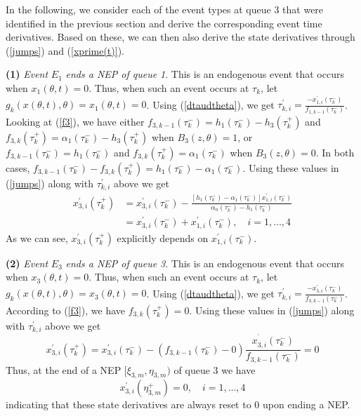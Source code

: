 \documentclass{ifacconf}\usepackage{graphicx}
\begin{document}
In the following, we consider each of the event types at queue $3$ that were
identified in the previous section and derive the corresponding event time
derivatives. Based on these, we can then also derive the state derivatives
through (\ref{jumps}) and (\ref{xprime(t)}).

\textbf{(1)} \emph{Event }$E_{1}$\emph{ ends a NEP of queue 1}. This is an
endogenous event that occurs when $x_{1}(\theta,t)=0$. Thus, when such an
event occurs at $\tau_{k}$, let $g_{k}(x(\theta,t),\theta)=x_{1}(\theta,t)=0$.
Using (\ref{dtaudtheta}), we get $\tau_{k,i}^{\prime}=\frac{-x_{1,i}^{\prime
}(\tau_{k}^{-})}{f_{1,k-1}(\tau_{k}^{-})}$. Looking at (\ref{f3}), we have
either $f_{3,k-1}(\tau_{k}^{-})=h_{1}(\tau_{k}^{-})-h_{3}(\tau_{k}^{+})$ and
$f_{3,k}(\tau_{k}^{+})=\alpha_{1}(\tau_{k}^{-})-h_{3}(\tau_{k}^{+})$ when
$B_{3}(z,\theta)=1$, or $f_{3,k-1}(\tau_{k}^{-})=h_{1}(\tau_{k}^{-})$ and
$f_{3,k}(\tau_{k}^{+})=\alpha_{1}(\tau_{k}^{-})$ when $B_{3}(z,\theta)=0$. In
both cases, $f_{3,k-1}(\tau_{k}^{-})-f_{3,k}(\tau_{k}^{+})=h_{1}(\tau_{k}^{-})-\alpha_{1}(\tau_{k}^{-})$. Using these values in (\ref{jumps}) along
with $\tau_{k,i}^{\prime}$ above we get\begin{align}
x_{3,i}^{\prime}(\tau_{k}^{+}) &  =x_{3,i}^{\prime}(\tau_{k}^{-})-\frac
{[h_{1}(\tau_{k}^{-})-\alpha_{1}(\tau_{k}^{-})]x_{1,i}^{\prime}(\tau_{k}^{-})}{\alpha_{n}(\tau_{k}^{-})-h_{1}(\tau_{k}^{-})}\nonumber\\
&  =x_{3,i}^{\prime}(\tau_{k}^{-})+x_{1,i}^{\prime}(\tau_{k}^{-}),\quad
i=1,\ldots,4\label{type1}\end{align}
As we can see, $x_{3,i}^{\prime}(\tau_{k}^{+})$ explicitly depends on
$x_{1,i}^{\prime}(\tau_{k}^{-})$.

\textbf{(2)} \emph{Event }$E_{3}$\emph{ ends a NEP of queue 3}. This is an
endogenous event that occurs when $x_{3}(\theta,t)=0$. Thus, when such an
event occurs at $\tau_{k}$, let $g_{k}(x(\theta,t),\theta)=x_{3}(\theta,t)=0$.
Using (\ref{dtaudtheta}), we get $\tau_{k,i}^{\prime}=\frac{-x_{3,i}^{\prime
}(\tau_{k}^{-})}{f_{3,k-1}(\tau_{k}^{-})}$. According to (\ref{f3}), we have
$f_{3,k}(\tau_{k}^{+})=0$. Using these values in (\ref{jumps}) along with
$\tau_{k,i}^{\prime}$ above we get\[
x_{3,i}^{\prime}(\tau_{k}^{+})=x_{3,i}^{\prime}(\tau_{k}^{-})-(f_{3,k-1}(\tau_{k}^{-})-0)\frac{x_{3,i}^{^{\prime}}(\tau_{k}^{-})}{f_{3,k-1}(\tau
_{k}^{-})}=0
\]
Thus, at the end of a NEP $[\xi_{3,m},\eta_{3,m})$ of queue $3$ we have\begin{equation}
x_{3,i}^{\prime}(\eta_{3,m}^{+})=0,\quad i=1,\ldots,4\label{E_event}\end{equation}
indicating that these state derivatives are always reset to $0$ upon ending a NEP.
\end{document}
